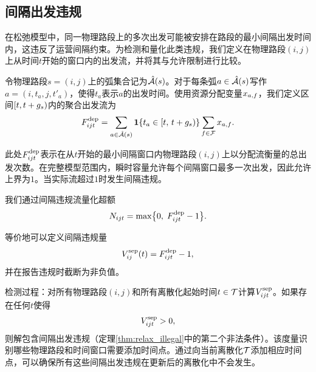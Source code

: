 \subsection{间隔出发违规}
在松弛模型中，同一物理路段上的多次出发可能被安排在路段的最小间隔出发时间内，这违反了运营间隔约束。为检测和量化此类违规，我们定义在物理路段$(i,j)$上从时间$t$开始的窗口内的出发流，并将其与允许限制进行比较。

令物理路段$s = (i,j)$上的弧集合记为$\hat{\mathcal{A}}(s)$。对于每条弧$a\in\hat{\mathcal{A}}(s)$写作$a=(i,t_a,j,t'_a)$，使得$t_a$表示$a$的出发时间。使用资源分配变量$x_{a,f}$，我们定义区间$[t, t+g_{s})$内的聚合出发流为
\begin{equation}
    F^{\text{dep}}_{ijt} = \sum_{a\in\hat{\mathcal{A}}(s)} \mathbf{1}\{t_a \in [t,\, t+g_{s})\} \sum_{f\in\mathcal{F}} x_{a,f}.
\end{equation}

此处$F^{\text{dep}}_{ijt}$表示在从$t$开始的最小间隔窗口内物理路段$(i,j)$上以分配流衡量的总出发次数。在完整模型范围内，瞬时容量允许每个间隔窗口最多一次出发，因此允许上界为$1$。当实际流超过$1$时发生间隔违规。

我们通过间隔违规流量化超额
\begin{equation}
    N_{ijt} = \max\bigl\{0,\; F^{\text{dep}}_{ijt} - 1\bigr\}.
\end{equation}

等价地可以定义间隔违规量
\begin{equation}
    V^{\text{sep}}_{ij}(t) = F^{\text{dep}}_{ijt} - 1,
\end{equation}
并在报告违规时截断为非负值。

检测过程：对所有物理路段$(i,j)$和所有离散化起始时间$t\in\mathcal{T}$计算$V^{\text{sep}}_{ijt}$。如果存在任何$t$使得
\begin{equation}
    V^{\text{sep}}_{ijt} > 0,
\end{equation}
则解包含间隔出发违规（定理\ref{thm:relax_illegal}中的第二个非法条件）。该度量识别哪些物理路段和时间窗口需要添加时间点。通过向当前离散化$\mathcal{T}$添加相应时间点，可以确保所有这些间隔出发违规在更新后的离散化中不会发生。
